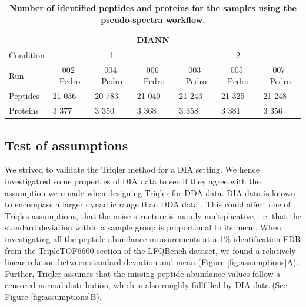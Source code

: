 \documentclass[10pt,letterpaper]{article}
\begin{document}
\begin{table}[H]
\begin{tabular}{lllllll}
\hline
\multicolumn{7}{c}{DIANN}                                                                                                                                                                                 \\ \hline
Condition & \multicolumn{3}{c}{1}                                                                         & \multicolumn{3}{c}{2}                                                                         \\
Run       & \multicolumn{1}{c}{002-Pedro} & \multicolumn{1}{c}{004-Pedro} & \multicolumn{1}{c}{006-Pedro} & \multicolumn{1}{c}{003-Pedro} & \multicolumn{1}{c}{005-Pedro} & \multicolumn{1}{c}{007-Pedro} \\
Peptides  & 21 036                        & 20 783                        & 21 040                        & 21 243                        & 21 325                        & 21 248                        \\
Proteins  & 3 377                         & 3 350                         & 3 368                         & 3 358                         & 3 381                         & 3 356                         \\ \hline
\end{tabular}
 \caption{{\bf Number of identified peptides and proteins for the samples using the pseudo-spectra workflow.}
      \label{fig:diann_peptide_and_protein_id}}
\end{table}

\subsection*{Test of assumptions}

We strived to validate the Triqler method for a DIA setting. We hence investigatred some properties of DIA data to see if they agree with the assumption we mnade when designing Triqler for DDA data. DIA data is known to encompass a larger dynamic range than DDA data . This could affect one of Triqles assumptions, that the noise structure is mainly multiplicative, i.e. that the standard deviation within a sample group is proportional to its mean. When investigating all the peptide abundance measurements at a 1\% identification FDR from the TripleTOF6600 section of the LFQBench dataset, we found a relatively linear relation between standard deviation and mean (Figure \ref{fig:assumptions}A). Further, Triqler assumes that the missing peptide abundance values follow a censored normal distribution, which is also roughly fullfilled by DIA data (See Figure \ref{fig:assumptions}B).
\end{document}
